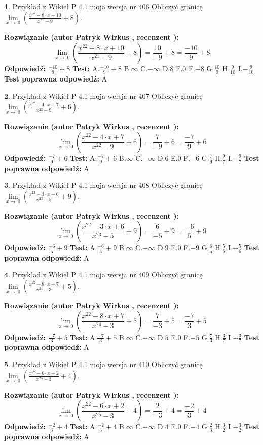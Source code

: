 \documentclass[12pt, a4paper]{article}
\theoremstyle{definition} %
\newtheorem{zad}{}
\newcommand{\zadStart}[1]{\begin{zad}#1\newline}
\newcommand{\zadStop}{\end{zad}}
\newcommand{\rozwStart}[2]{\noindent \textbf{Rozwiązanie (autor #1 , recenzent #2): }\newline}
\newcommand{\rozwStop}{\newline}
\newcommand{\odpStart}{\noindent \textbf{Odpowiedź:}\newline}
\newcommand{\odpStop}{\newline}
\newcommand{\testStart}{\noindent \textbf{Test:}\newline}
\newcommand{\testStop}{\newline}
\newcommand{\kluczStart}{\noindent \textbf{Test poprawna odpowiedź:}\newline}
\newcommand{\kluczStop}{\newline}
\begin{document}
\zadStart{Przykład z Wikieł P 4.1 moja wersja nr 406}
Obliczyć granicę $\lim\limits_{x\to\ 0}(\frac{x^{22}-8 \cdot x +10}{x^{21}-9}+8)$.
\zadStop
\rozwStart{Patryk Wirkus}{}
$$\lim\limits_{x\to\ 0}(\frac{x^{22}-8 \cdot x +10}{x^{21}-9}+8)=\frac{10}{-9}+8=\frac{-10}{9}+8$$
\rozwStop
\odpStart
$\frac{-10}{9}+8$
\odpStop
\testStart
A.$\frac{-10}{9}+8$
B.$\infty$
C.$-\infty$
D.$8$
E.$0$
F.$-8$
G.$\frac{10}{9}$
H.$\frac{9}{10}$
I.$-\frac{9}{10}$
\testStop
\kluczStart
A
\kluczStop



\zadStart{Przykład z Wikieł P 4.1 moja wersja nr 407}
Obliczyć granicę $\lim\limits_{x\to\ 0}(\frac{x^{22}-4 \cdot x +7}{x^{22}-9}+6)$.
\zadStop
\rozwStart{Patryk Wirkus}{}
$$\lim\limits_{x\to\ 0}(\frac{x^{22}-4 \cdot x +7}{x^{22}-9}+6)=\frac{7}{-9}+6=\frac{-7}{9}+6$$
\rozwStop
\odpStart
$\frac{-7}{9}+6$
\odpStop
\testStart
A.$\frac{-7}{9}+6$
B.$\infty$
C.$-\infty$
D.$6$
E.$0$
F.$-6$
G.$\frac{7}{9}$
H.$\frac{9}{7}$
I.$-\frac{9}{7}$
\testStop
\kluczStart
A
\kluczStop



\zadStart{Przykład z Wikieł P 4.1 moja wersja nr 408}
Obliczyć granicę $\lim\limits_{x\to\ 0}(\frac{x^{22}-3 \cdot x +6}{x^{23}-5}+9)$.
\zadStop
\rozwStart{Patryk Wirkus}{}
$$\lim\limits_{x\to\ 0}(\frac{x^{22}-3 \cdot x +6}{x^{23}-5}+9)=\frac{6}{-5}+9=\frac{-6}{5}+9$$
\rozwStop
\odpStart
$\frac{-6}{5}+9$
\odpStop
\testStart
A.$\frac{-6}{5}+9$
B.$\infty$
C.$-\infty$
D.$9$
E.$0$
F.$-9$
G.$\frac{6}{5}$
H.$\frac{5}{6}$
I.$-\frac{5}{6}$
\testStop
\kluczStart
A
\kluczStop



\zadStart{Przykład z Wikieł P 4.1 moja wersja nr 409}
Obliczyć granicę $\lim\limits_{x\to\ 0}(\frac{x^{22}-8 \cdot x +7}{x^{24}-3}+5)$.
\zadStop
\rozwStart{Patryk Wirkus}{}
$$\lim\limits_{x\to\ 0}(\frac{x^{22}-8 \cdot x +7}{x^{24}-3}+5)=\frac{7}{-3}+5=\frac{-7}{3}+5$$
\rozwStop
\odpStart
$\frac{-7}{3}+5$
\odpStop
\testStart
A.$\frac{-7}{3}+5$
B.$\infty$
C.$-\infty$
D.$5$
E.$0$
F.$-5$
G.$\frac{7}{3}$
H.$\frac{3}{7}$
I.$-\frac{3}{7}$
\testStop
\kluczStart
A
\kluczStop



\zadStart{Przykład z Wikieł P 4.1 moja wersja nr 410}
Obliczyć granicę $\lim\limits_{x\to\ 0}(\frac{x^{22}-6 \cdot x +2}{x^{25}-3}+4)$.
\zadStop
\rozwStart{Patryk Wirkus}{}
$$\lim\limits_{x\to\ 0}(\frac{x^{22}-6 \cdot x +2}{x^{25}-3}+4)=\frac{2}{-3}+4=\frac{-2}{3}+4$$
\rozwStop
\odpStart
$\frac{-2}{3}+4$
\odpStop
\testStart
A.$\frac{-2}{3}+4$
B.$\infty$
C.$-\infty$
D.$4$
E.$0$
F.$-4$
G.$\frac{2}{3}$
H.$\frac{3}{2}$
I.$-\frac{3}{2}$
\testStop
\kluczStart
A
\kluczStop
\end{document}
